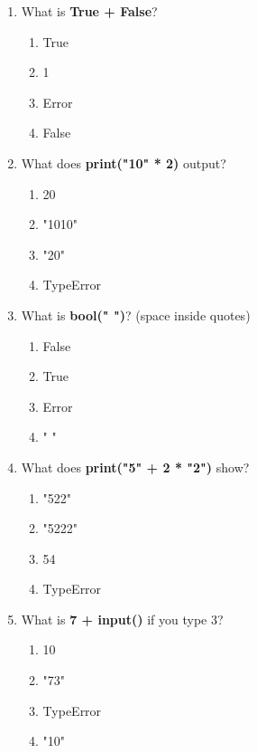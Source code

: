\documentclass{article}
\begin{document}
\begin{multicols*}{4}
\begin{enumerate}
        \item What is \textbf{True + False}?
        \begin{enumerate}[label=(\Alph*)]
            \item True
            \item 1
            \item Error
            \item False
        \end{enumerate}

        \item What does \textbf{print("10" * 2)} output?
        \begin{enumerate}[label=(\Alph*)]
            \item 20
            \item "1010"
            \item "20"
            \item TypeError
        \end{enumerate}

        \item What is \textbf{bool(" ")}? (space inside quotes)
        \begin{enumerate}[label=(\Alph*)]
            \item False
            \item True
            \item Error
            \item " "
        \end{enumerate}

        \item What does \textbf{print("5" + 2 * "2")} show?
        \begin{enumerate}[label=(\Alph*)]
            \item "522"
            \item "5222"
            \item 54
            \item TypeError
        \end{enumerate}

        \item What is \textbf{7 + input()} if you type 3?
        \begin{enumerate}[label=(\Alph*)]
            \item 10
            \item "73"
            \item TypeError
            \item "10"
        \end{enumerate}


\end{enumerate}
\end{multicols*}
\end{document}
